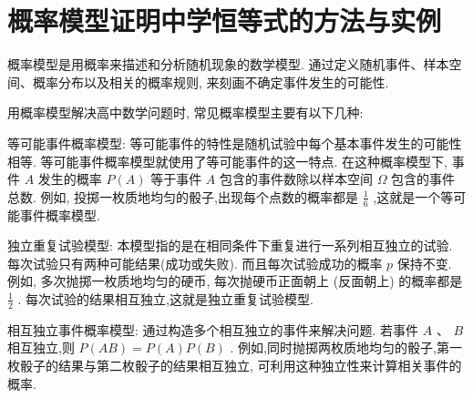 
\chapter{概率模型证明中学恒等式的方法与实例}
概率模型是用概率来描述和分析随机现象的数学模型. 通过定义随机事件、样本空间、概率分布以及相关的概率规则, 来刻画不确定事件发生的可能性. 



用概率模型解决高中数学问题时, 常见概率模型主要有以下几种:

等可能事件概率模型: 等可能事件的特性是随机试验中每个基本事件发生的可能性相等. 等可能事件概率模型就使用了等可能事件的这一特点. 在这种概率模型下, 事件 \(A\) 发生的概率 \(P\left( A\right)\) 等于事件 \(A\) 包含的事件数除以样本空间 \(\Omega\) 包含的事件总数. 例如, 投掷一枚质地均匀的骰子,出现每个点数的概率都是 \(\frac{1}{6}\) ,这就是一个等可能事件概率模型. 

独立重复试验模型: 本模型指的是在相同条件下重复进行一系列相互独立的试验. 每次试验只有两种可能结果(成功或失败). 而且每次试验成功的概率 \(p\) 保持不变. 例如, 多次抛掷一枚质地均匀的硬币, 每次抛硬币正面朝上 (反面朝上) 的概率都是 \(\frac{1}{2}\) . 每次试验的结果相互独立,这就是独立重复试验模型. 

相互独立事件概率模型: 通过构造多个相互独立的事件来解决问题. 若事件 \(A\) 、 \(B\) 相互独立,则 \(P\left( {AB}\right)  = P\left( A\right) P\left( B\right)\) . 例如,同时抛掷两枚质地均匀的骰子,第一枚骰子的结果与第二枚骰子的结果相互独立, 可利用这种独立性来计算相关事件的概率. 


